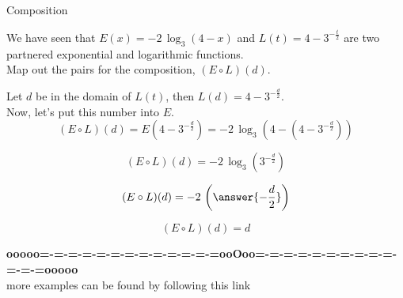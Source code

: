 \documentclass{ximera}
\begin{document}
\begin{example}  Composition

We have seen that $E(x) = -2 \, \log_3(4-x)$ and $L(t) = 4 - 3^{-\frac{t}{2}}$ are two partnered exponential and logarithmic functions. \\



Map out the pairs for the composition, $(E \circ L)(d)$.

\begin{explanation}



Let $d$ be in the domain of $L(t)$, then $L(d) = 4 - 3^{-\frac{d}{2}}$. \\

Now, let's put this number into $E$. \\



\[    (E \circ L)(d)  =  E(4 - 3^{-\frac{d}{2}}) = -2 \, \log_3(4 - (4 - 3^{-\frac{d}{2}}))            \]


\[    (E \circ L)(d)  =  -2 \, \log_3( 3^{-\frac{d}{2}})              \]


\[    (E \circ L)(d)  = -2 \, \left( \answer{-\frac{d}{2}} \right)              \]


\[    (E \circ L)(d)  = d            \]

\end{explanation}
\end{example}

























\begin{center}
\textbf{\textcolor{green!50!black}{ooooo=-=-=-=-=-=-=-=-=-=-=-=-=ooOoo=-=-=-=-=-=-=-=-=-=-=-=-=ooooo}} \\

more examples can be found by following this link\\ 

\end{center}
\end{document}
